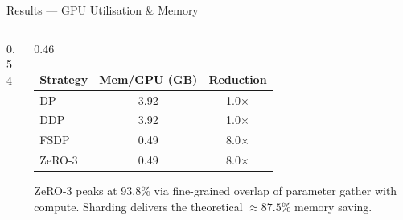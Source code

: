 \documentclass[10pt,aspectratio=169]{beamer}
\begin{document}
\begin{frame}{Results — GPU Utilisation \& Memory}
  \begin{columns}[T]
    \begin{column}{0.54\textwidth}
      \centering\scriptsize
    \end{column}
    \begin{column}{0.46\textwidth}
      \scriptsize
      \begin{tabular}{@{}lcc@{}}
        \toprule
        \textbf{Strategy} & \textbf{Mem/GPU (GB)} & \textbf{Reduction}\\
        \midrule
        DP  & 3.92 & 1.0$\times$\\
        DDP & 3.92 & 1.0$\times$\\
        FSDP & 0.49 & \alert{8.0$\times$}\\
        ZeRO-3 & 0.49 & \alert{8.0$\times$}\\
        \bottomrule
      \end{tabular}
      \vspace{1ex}

      \footnotesize
      ZeRO-3 peaks at \alert{93.8\%} via fine-grained overlap of
      parameter gather with compute. Sharding delivers the
      theoretical $\approx 87.5\%$ memory saving.
    \end{column}
  \end{columns}
\end{frame}
\end{document}
